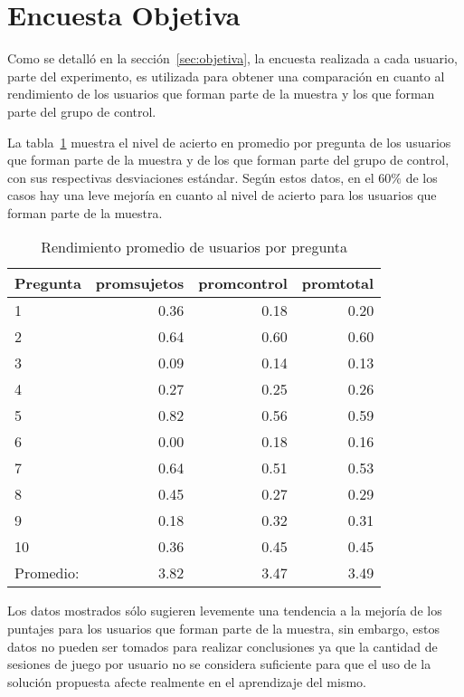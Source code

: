 \section{Encuesta Objetiva}
\label{sec:res_OBJETIVA}


Como se detalló en la sección~\ref{sec:objetiva}, la encuesta realizada a cada
usuario, parte del experimento, es utilizada para obtener una comparación en
cuanto al rendimiento de los usuarios que forman parte de la muestra y los que
forman parte del grupo de control.

La tabla~\ref{tab:objetiva_rendimiento_por_pregunta} muestra el nivel de acierto
en promedio por pregunta de los usuarios que forman parte de la muestra y de los que
forman parte del grupo de control, con sus respectivas desviaciones estándar. Según
estos datos, en el $60\%$ de los casos hay una leve mejoría en cuanto al nivel de acierto
para los usuarios que forman parte de la muestra.

\begin{table}[!hbt]
\centering
\begin{tabular}{lrrr}
\toprule
\textbf{Pregunta} & 
\textbf{promsujetos} & 
\textbf{promcontrol} & 
\textbf{promtotal} \\ 
\midrule
1         & 0.36 & 0.18 & 0.20 \\
2         & 0.64 & 0.60 & 0.60 \\
3         & 0.09 & 0.14 & 0.13 \\
4         & 0.27 & 0.25 & 0.26 \\
5         & 0.82 & 0.56 & 0.59 \\
6         & 0.00 & 0.18 & 0.16 \\
7         & 0.64 & 0.51 & 0.53 \\
8         & 0.45 & 0.27 & 0.29 \\
9         & 0.18 & 0.32 & 0.31 \\
10        & 0.36 & 0.45 & 0.45 \\
\midrule
Promedio: & 3.82 & 3.47 & 3.49  \\
\bottomrule
\end{tabular}
\caption{Rendimiento promedio de usuarios por pregunta}
\label{tab:objetiva_rendimiento_por_pregunta}
\end{table}

Los datos mostrados sólo sugieren levemente una tendencia a la mejoría de los puntajes 
para los usuarios que forman parte de la muestra, sin embargo, estos datos no pueden ser 
tomados para realizar conclusiones ya que la cantidad de sesiones de juego por usuario no 
se considera suficiente para que el uso de la solución propuesta afecte realmente en el 
aprendizaje del mismo.
